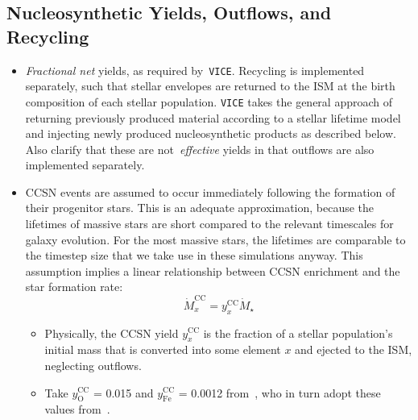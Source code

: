 \documentclass[fleqn, usenatbib]{mnras}
\begin{document}
\subsection{Nucleosynthetic Yields, Outflows, and Recycling}  
\label{sec:methods:yields} 
\begin{itemize} 
	\item \textit{Fractional net} yields, as required by~\texttt{VICE}. 
	Recycling is implemented separately, such that stellar envelopes are 
	returned to the ISM at the birth composition of each stellar population. 
	\texttt{VICE} takes the general approach of returning previously produced 
	material according to a stellar lifetime model and injecting newly 
	produced nucleosynthetic products as described below. Also clarify that 
	these are not~\textit{effective} yields in that outflows are also 
	implemented separately. 

	\item CCSN events are assumed to occur immediately following the formation 
	of their progenitor stars. This is an adequate approximation, because the 
	lifetimes of massive stars are short compared to the relevant timescales 
	for galaxy evolution. For the most massive stars, the lifetimes are 
	comparable to the timestep size that we take use in these simulations 
	anyway. This assumption implies a linear relationship between CCSN 
	enrichment and the star formation rate: 
	\begin{equation} 
	\dot{M}_x^\text{CC} = y_x^\text{CC}\dot{M}_\star 
	\end{equation} 
	\begin{itemize} 
		\item Physically, the CCSN yield $y_x^\text{CC}$ is the fraction of a 
		stellar population's initial mass that is converted into some element 
		$x$ and ejected to the ISM, neglecting outflows. 

		\item Take $y_\text{O}^\text{CC}$ = 0.015 and $y_\text{Fe}^\text{CC}$ 
		= 0.0012 from~\citet{Johnson2020}, who in turn adopt these values 
		from~\citet{Weinberg2017}. 
	\end{itemize} 


\end{itemize}
\end{document}
